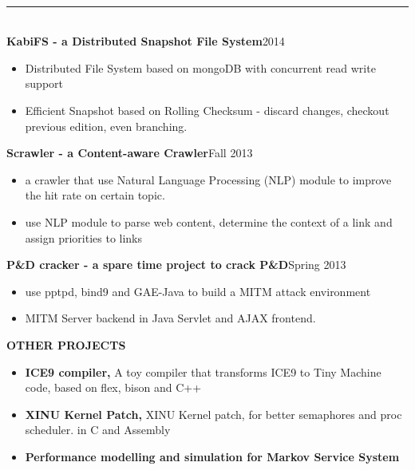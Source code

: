 \documentclass[10pt,oneside,letter,final]{article}
\newenvironment{CVsection}[1]{
    \hspace*{20pt}{\bf \Large #1}\\[-3pt]
    \rule[5pt]{\textwidth}{1pt}\\
}{
    \hspace{-10pt}\hfill\\[10pt]
}
\newenvironment{CVproject}[2]{
    {\bf #1}\hfill #2\\[2pt]
    \begin{itemize}
        \setlength{\parsep}{0pt}
        \setlength{\itemsep}{0pt}\vspace{-16pt}
}{
    \end{itemize}
}
\begin{document}
    \begin{CVsection}{\Large P\large ROJECTS}
        \begin{CVproject}{KabiFS - a Distributed Snapshot File System}{2014}
            \item Distributed File System based on mongoDB with concurrent read write support
            \item Efficient Snapshot based on Rolling Checksum - discard changes, checkout previous edition, even branching.
        \end{CVproject}
        
        \begin{CVproject}{Scrawler - a Content-aware Crawler}{Fall 2013}
            \item a crawler that use Natural Language Processing (NLP) module to improve the hit rate on certain topic.
            \item use NLP module to parse web content, determine the context of a link and assign priorities to links
        \end{CVproject}
        
        \begin{CVproject}{P\&D cracker - a spare time project to crack P\&D}{Spring 2013}
            \item use pptpd, bind9 and GAE-Java to build a MITM attack environment
            \item MITM Server backend in Java Servlet and AJAX frontend.
        \end{CVproject}
        
        \begin{CVproject}{OTHER PROJECTS}{}
            \item {\bf ICE9 compiler,} A toy compiler that transforms ICE9 to Tiny Machine code, based on flex, bison and C++
            \item {\bf XINU Kernel Patch,} XINU Kernel patch, for better semaphores and proc scheduler. in C and Assembly
            \item {\bf {Performance modelling and simulation for Markov Service System}}
        \end{CVproject}
    \end{CVsection}
    \\[-20pt]                                %
\end{document}
